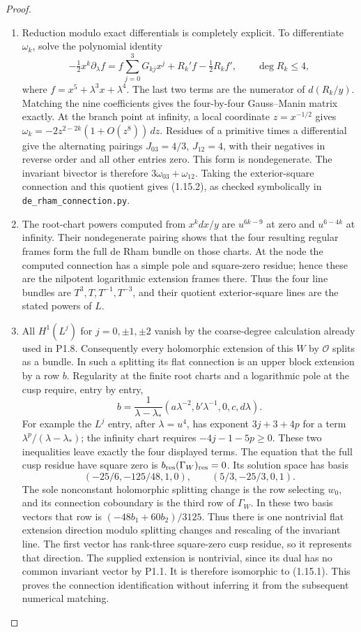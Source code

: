\documentclass[11pt,a4paper]{article}
\theoremstyle{definition}
\begin{document}
\begin{proof}
\begin{enumerate}[label=\arabic*.]
\item Reduction modulo exact differentials is completely explicit.  To
differentiate $\omega_k$, solve the polynomial identity
\[
-\tfrac12x^k\partial_\lambda f
 =f\sum_{j=0}^3G_{kj}x^j+R_k'f-\tfrac12R_kf',
 \qquad\deg R_k\leq4,
\]
where $f=x^5+\lambda^3x+\lambda^4$.  The last two terms are the
numerator of $d(R_k/y)$.  Matching the nine coefficients gives the
four-by-four Gauss--Manin matrix exactly.
At the branch point at infinity, a local coordinate $z=x^{-1/2}$
gives $\omega_k=-2z^{2-2k}(1+O(z^8))\,dz$.
Residues of a primitive times a differential give the alternating
pairings $J_{03}=4/3$, $J_{12}=4$, with their negatives in reverse
order and all other entries zero.  This form is nondegenerate.
The invariant bivector is therefore $3\omega_{03}+\omega_{12}$.
Taking the exterior-square connection and this quotient gives
(1.15.2), as checked symbolically in \texttt{de\_rham\_connection.py}.

\item The root-chart powers computed from $x^kdx/y$ are
$u^{6k-9}$ at zero and $u^{6-4k}$ at infinity.
Their nondegenerate pairing shows that the four resulting regular
frames form the full de Rham bundle on those charts.  At the node
the computed connection has a simple pole and square-zero residue;
hence these are the nilpotent logarithmic extension frames there.
Thus the four line bundles are
$T^3,T,T^{-1},T^{-3}$, and their quotient exterior-square lines are
the stated powers of $L$.

\item All $H^1(L^j)$ for $j=0,\pm1,\pm2$ vanish by the coarse-degree
calculation already used in P1.8.  Consequently every holomorphic
extension of this $W$ by $\mathcal O$ splits as a bundle.
In such a splitting its flat connection is an upper block extension
by a row $b$.  Regularity at the finite root charts and a logarithmic
pole at the cusp require, entry by entry,
\[
b=\frac1{\lambda-\lambda_*}
 (a\lambda^{-2},b'\lambda^{-1},0,c,d\lambda).
\]
For example the $L^j$ entry, after $\lambda=u^4$, has exponent
$3j+3+4p$ for a term $\lambda^p/ (\lambda-\lambda_*)$;
the infinity chart requires $-4j-1-5p\geq0$.
These two inequalities leave exactly the four displayed terms.
The equation that the full cusp residue have square zero is
$b_{\rm res}(\Gamma_W)_{\rm res}=0$.
Its solution space has basis
\[
(-25/6,-125/48,1,0),\qquad(5/3,-25/3,0,1).
\]
The sole nonconstant holomorphic splitting change is the row selecting
$w_0$, and its connection coboundary is the third row of $\Gamma_W$.
In these two basis vectors that row is $(-48b_1+60b_2)/3125$.
Thus there is one nontrivial flat extension direction modulo splitting
changes and rescaling of the invariant line.  The first vector has
rank-three square-zero cusp residue, so it represents that direction.
The supplied extension is nontrivial, since its dual has no common
invariant vector by P1.1.  It is therefore isomorphic to (1.15.1).
This proves the connection identification without inferring it from
the subsequent numerical matching.


\end{enumerate}
\end{proof}
\end{document}
